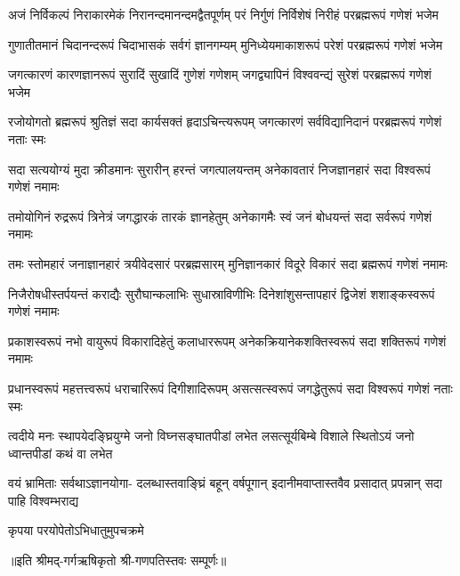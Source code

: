 


\fourlineindentedshloka
{अजं निर्विकल्पं निराकारमेकं}
{निरानन्दमानन्दमद्वैतपूर्णम्}
{परं निर्गुणं निर्विशेषं निरीहं}
{परब्रह्मरूपं गणेशं भजेम}%

\fourlineindentedshloka
{गुणातीतमानं चिदानन्दरूपं}
{चिदाभासकं सर्वगं ज्ञानगम्यम्}
{मुनिध्येयमाकाशरूपं परेशं}
{परब्रह्मरूपं गणेशं भजेम}%

\fourlineindentedshloka
{जगत्कारणं कारणज्ञानरूपं}
{सुरादिं सुखादिं गुणेशं गणेशम्}
{जगद्व्यापिनं विश्ववन्द्यं सुरेशं}
{परब्रह्मरूपं गणेशं भजेम}%

\fourlineindentedshloka
{रजोयोगतो ब्रह्मरूपं श्रुतिज्ञं}
{सदा कार्यसक्तं हृदाऽचिन्त्यरूपम्}
{जगत्कारणं सर्वविद्यानिदानं}
{परब्रह्मरूपं गणेशं नताः स्मः}%

\fourlineindentedshloka
{सदा सत्ययोग्यं मुदा क्रीडमानः}
{सुरारीन् हरन्तं जगत्पालयन्तम्}
{अनेकावतारं निजज्ञानहारं}
{सदा विश्वरूपं गणेशं नमामः}%


\fourlineindentedshloka
{तमोयोगिनं रुद्ररूपं त्रिनेत्रं}
{जगद्धारकं तारकं ज्ञानहेतुम्}
{अनेकागमैः स्वं जनं बोधयन्तं}
{सदा सर्वरूपं गणेशं नमामः}%

\fourlineindentedshloka
{तमः स्तोमहारं जनाज्ञानहारं}
{त्रयीवेदसारं परब्रह्मसारम्}
{मुनिज्ञानकारं विदूरे विकारं}
{सदा ब्रह्मरूपं गणेशं नमामः}%

\fourlineindentedshloka
{निजैरोषधीस्तर्पयन्तं कराद्यैः}
{सुरौघान्कलाभिः सुधास्राविणीभिः}
{दिनेशांशुसन्तापहारं द्विजेशं}
{शशाङ्कस्वरूपं गणेशं नमामः}%

\fourlineindentedshloka
{प्रकाशस्वरूपं नभो वायुरूपं}
{विकारादिहेतुं कलाधाररूपम्}
{अनेकक्रियानेकशक्तिस्वरूपं}
{सदा शक्तिरूपं गणेशं नमामः}%

\fourlineindentedshloka
{प्रधानस्वरूपं महत्तत्त्वरूपं}
{धराचारिरूपं दिगीशादिरूपम्}
{असत्सत्स्वरूपं जगद्धेतुरूपं}
{सदा विश्वरूपं गणेशं नताः स्मः}%

\fourlineindentedshloka
{त्वदीये मनः स्थापयेदङ्घ्रियुग्मे}
{जनो विघ्नसङ्घातपीडां लभेत}
{लसत्सूर्यबिम्बे विशाले स्थितोऽयं}
{जनो ध्वान्तपीडां कथं वा लभेत}%

\fourlineindentedshloka
{वयं भ्रामिताः सर्वथाऽज्ञानयोगा-}
{दलब्धास्तवाङ्घ्रिं बहून् वर्षपूगान्}
{इदानीमवाप्तास्तवैव प्रसादात्}
{प्रपन्नान् सदा पाहि विश्वम्भराद्य}%

{कृपया परयोपेतोऽभिधातुमुपचक्रमे}%

॥इति श्रीमद्-गर्गऋषिकृतो श्री-गणपतिस्तवः सम्पूर्णः॥
